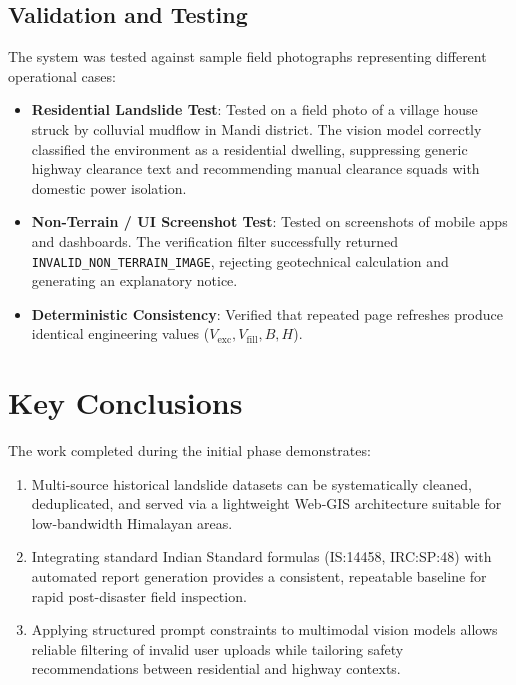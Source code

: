 \documentclass[12pt,a4paper]{report}
\begin{document}
\section{Validation and Testing}
The system was tested against sample field photographs representing different operational cases:
\begin{itemize}
    \item \textbf{Residential Landslide Test}: Tested on a field photo of a village house struck by colluvial mudflow in Mandi district. The vision model correctly classified the environment as a residential dwelling, suppressing generic highway clearance text and recommending manual clearance squads with domestic power isolation.
    \item \textbf{Non-Terrain / UI Screenshot Test}: Tested on screenshots of mobile apps and dashboards. The verification filter successfully returned \texttt{INVALID\_NON\_TERRAIN\_IMAGE}, rejecting geotechnical calculation and generating an explanatory notice.
    \item \textbf{Deterministic Consistency}: Verified that repeated page refreshes produce identical engineering values ($V_{\text{exc}}, V_{\text{fill}}, B, H$).
\end{itemize}

\newpage

\chapter{Key Conclusions}

The work completed during the initial phase demonstrates:
\begin{enumerate}
    \item Multi-source historical landslide datasets can be systematically cleaned, deduplicated, and served via a lightweight Web-GIS architecture suitable for low-bandwidth Himalayan areas.
    \item Integrating standard Indian Standard formulas (IS:14458, IRC:SP:48) with automated report generation provides a consistent, repeatable baseline for rapid post-disaster field inspection.
    \item Applying structured prompt constraints to multimodal vision models allows reliable filtering of invalid user uploads while tailoring safety recommendations between residential and highway contexts.
\end{enumerate}

\newpage

\end{document}
